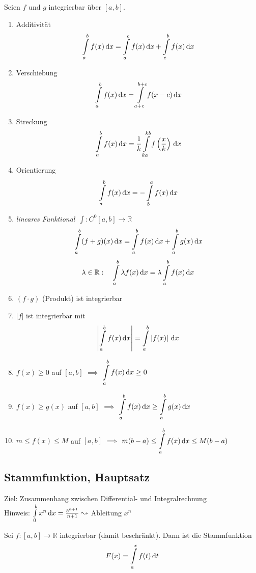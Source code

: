 
\begin{theorem}
  Seien $f$ und $g$ integrierbar über $[a,b]$.
  \begin{enumerate}
    \item Additivität \[ \int\limits_a^b f(x)\,\mathrm d x = \int\limits_a^c f(x)\,\mathrm d x + \int\limits_c^b f(x)\, \mathrm d x \]
    \item Verschiebung \[ \int\limits_a^b f(x)\,\mathrm d x = \int\limits_{a+c}^{b+c} f(x-c)\,\mathrm d x \]
    \item Streckung  \[ \int\limits_a^b f(x)\,\mathrm d x = \frac 1 k \int\limits_{ka}^{kb} f\left(\frac x k\right)\,\mathrm d x \]
    \item Orientierung \[ \int\limits_a^b f(x)\,\mathrm d x = - \int\limits_b^a f(x)\,\mathrm d x \]
    \item \emph{lineares Funktional}\ $\int: C^0[a,b] \to \mathbb{R}$
      \[ \int\limits_a^b (f+g)(x)\,\mathrm d x = \int\limits_a^b f(x)\,\mathrm d x + \int\limits_a^b g(x)\,\mathrm d x \]
      \[ \lambda \in \mathbb{R}: \quad \int\limits_a^b \lambda f(x)\,\mathrm d x  = \lambda \int\limits_a^b f(x)\,\mathrm d x \]
    \item $(f \cdot g)$ (Produkt) ist integrierbar
    \item $\left| f \right|$ ist integrierbar mit
      \[ \left| \int\limits_a^b f(x)\,\mathrm d x\right| = \int\limits_a^b \left| f(x) \right| \,\mathrm d x \]
    \item $f(x) \geq 0$ auf $[a,b]$ $\implies$ $\displaystyle \int\limits_a^b f(x)\,\mathrm d x \geq 0$
    \item $f(x) \geq g(x)$ auf $[a,b]$ $\implies$ $\displaystyle \int\limits_a^b f(x)\,\mathrm d x \geq \int\limits_a^b g(x)\,\mathrm d x$
    \item $m \leq f(x) \leq M$ auf $[a,b]$ $\implies$ $\displaystyle m(b-a) \leq \int\limits_a^b f(x)\,\mathrm d x \leq M(b-a)$
  \end{enumerate}
\end{theorem}

\subsection{Stammfunktion, Hauptsatz}

Ziel: Zusammenhang zwischen Differential- und Integralrechnung\\
Hinweis: $\int\limits_0^b x^n\,\mathrm d x = \frac{b^{n+1}}{n+1} \leadsto$ Ableitung $x^n$

\begin{definition}[Stammfunktion $F$]
  Sei $f: [a,b] \to \mathbb{R}$ integrierbar (damit beschränkt). Dann ist die Stammfunktion
  \[ F(x) = \int\limits_a^x f(t)\,\mathrm d t \]
\end{definition}


